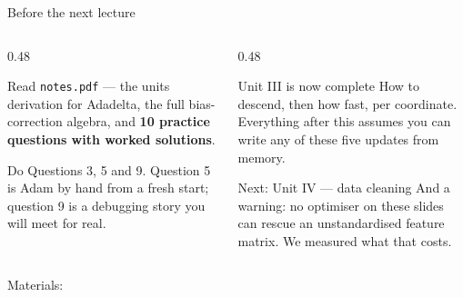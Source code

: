 \documentclass[aspectratio=169]{beamer}
\begin{document}
\begin{frame}[shrink=3]{Before the next lecture}
  \begin{columns}[T]
    \begin{column}{0.48\textwidth}
      \begin{block}{Read}
        \texttt{notes.pdf} --- the units derivation for Adadelta, the full
        bias-correction algebra, and \textbf{10 practice questions with worked
        solutions}.
      \end{block}
      \begin{block}{Do}
        Questions 3, 5 and 9. Question 5 is Adam by hand from a fresh start;
        question 9 is a debugging story you will meet for real.
      \end{block}
    \end{column}
    \begin{column}{0.48\textwidth}
      \begin{exampleblock}{Unit III is now complete}
        How to descend, then how fast, per coordinate.\\[0.3em]
        Everything after this assumes you can write any of these five updates
        from memory.
      \end{exampleblock}
      \begin{alertblock}{Next: Unit IV --- data cleaning}
        And a warning: no optimiser on these slides can rescue an
        unstandardised feature matrix. We measured what that costs.
      \end{alertblock}
    \end{column}
  \end{columns}
  \begin{center}
    \small Materials: \texttt{\AMLRepoURL}
  \end{center}
  \slidesources{\AMLUnitIIISources}
\end{frame}
\end{document}
